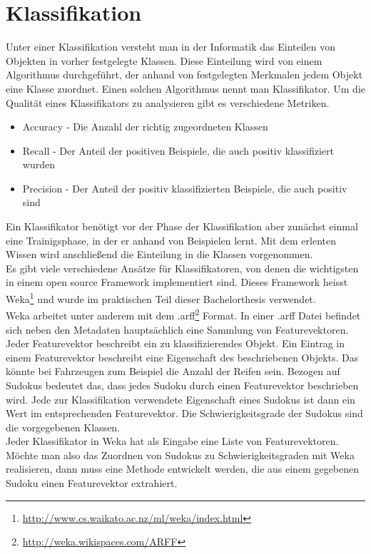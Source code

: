 \section{Klassifikation}
\label{Klassifikation}
Unter einer Klassifikation versteht man in der Informatik das Einteilen von Objekten in vorher festgelegte Klassen. Diese Einteilung wird von einem Algorithmus durchgeführt, der anhand von festgelegten Merkmalen jedem Objekt eine Klasse zuordnet. Einen solchen Algorithmus nennt man Klassifikator. Um die Qualität eines Klassifikators zu analysieren gibt es verschiedene Metriken.
\begin{itemize}
\item Accuracy - Die Anzahl der richtig zugeordneten Klassen
\item Recall - Der Anteil der positiven Beispiele, die auch positiv klassifiziert wurden
\item Precision - Der Anteil der positiv klassifizierten Beispiele, die auch positiv sind
\end{itemize}
Ein Klassifikator benötigt vor der Phase der Klassifikation aber zunächst einmal eine Trainigsphase, in der er anhand von Beispielen lernt. Mit dem erlenten Wissen wird anschließend die Einteilung in die Klassen vorgenommen.\\
Es gibt viele verschiedene Ansätze für Klassifikatoren, von denen die wichtigsten in einem open source Framework implementiert sind. Dieses Framework heisst Weka\footnote{\url{http://www.cs.waikato.ac.nz/ml/weka/index.html}} und wurde im praktischen Teil dieser Bachelorthesis verwendet.\\
Weka arbeitet unter anderem mit dem .arff\footnote{\url{http://weka.wikispaces.com/ARFF}} Format. In einer .arff Datei befindet sich neben den Metadaten hauptsächlich eine Sammlung von Featurevektoren. Jeder Featurevektor beschreibt ein zu klassifizierendes Objekt. Ein Eintrag in einem Featurevektor beschreibt eine Eigenschaft des beschriebenen Objekts. Das könnte bei Fahrzeugen zum Beispiel die Anzahl der Reifen sein. Bezogen auf Sudokus bedeutet das, dass jedes Sudoku durch einen Featurevektor beschrieben wird. Jede zur Klassifikation verwendete Eigenschaft eines Sudokus ist dann ein Wert im entsprechenden Featurevektor. Die Schwierigkeitsgrade der Sudokus sind die vorgegebenen Klassen.\\
Jeder Klassifikator in Weka hat als Eingabe eine Liste von Featurevektoren. Möchte man also das Zuordnen von Sudokus zu Schwierigkeitsgraden mit Weka realisieren, dann muss eine Methode entwickelt werden, die aus einem gegebenen Sudoku einen Featurevektor extrahiert.\\

